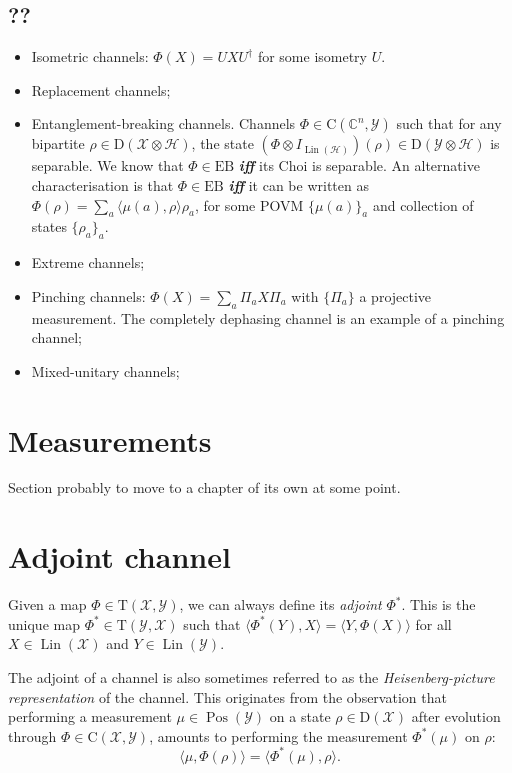 \documentclass[12pt]{report}
\newcommand{\CC}{\mathbb{C}}
\newcommand{\calH}{{\mathcal{H}}}
\newcommand{\calY}{{\mathcal{Y}}}
\newcommand{\calX}{{\mathcal{X}}}
\newcommand{\rmC}{{\mathrm{C}}}
\newcommand{\rmD}{{\mathrm{D}}}
\newcommand{\rmT}{{\mathrm{T}}}
\DeclareMathOperator{\Pos}{Pos}
\DeclareMathOperator{\Lin}{Lin}
\begin{document}
\subsection{??}

\begin{itemize}
	\item Isometric channels: $\Phi(X)=UXU^\dagger$ for some isometry $U$.
	\item Replacement channels;
	\item Entanglement-breaking channels. Channels $\Phi\in\rmC(\CC^n,\calY)$ such that for any bipartite $\rho\in\rmD(\calX\otimes\calH)$, the state $(\Phi\otimes I_{\Lin(\calH)})(\rho)\in\rmD(\calY\otimes\calH)$ is separable. We know that $\Phi\in\mathrm{EB}$ \emph{\textbf{iff}} its Choi is separable.
	An alternative characterisation is that $\Phi\in\mathrm{EB}$ \emph{\textbf{iff}} it can be written as $\Phi(\rho)=\sum_a \langle \mu(a),\rho\rangle \rho_a$, for some POVM $\{\mu(a)\}_a$ and collection of states $\{\rho_a\}_a$.
	\item Extreme channels;
	\item Pinching channels: $\Phi(X) =\sum_a \Pi_a X\Pi_a$ with $\{\Pi_a\}$ a projective measurement. The completely dephasing channel is an example of a pinching channel;
	\item Mixed-unitary channels;
\end{itemize}

\section{Measurements}

Section probably to move to a chapter of its own at some point.

\section{Adjoint channel}

Given a map $\Phi\in\rmT(\calX,\calY)$, we can always define its \emph{adjoint} $\Phi^*$. This is the unique map $\Phi^*\in\rmT(\calY,\calX)$ such that $\langle \Phi^*(Y),X\rangle=\langle Y,\Phi(X)\rangle$ for all $X\in\Lin(\calX)$ and $Y\in\Lin(\calY)$.

The adjoint of a channel is also sometimes referred to as the \emph{Heisenberg-picture representation} of the channel. This originates from the observation that performing a measurement $\mu\in\Pos(\calY)$ on a state $\rho\in\rmD(\calX)$ after evolution through $\Phi\in\rmC(\calX,\calY)$, amounts to performing the measurement $\Phi^*(\mu)$ on $\rho$:
\begin{equation}
	\langle \mu,\Phi(\rho) \rangle = \langle \Phi^*(\mu),\rho\rangle.
\end{equation}
\end{document}
